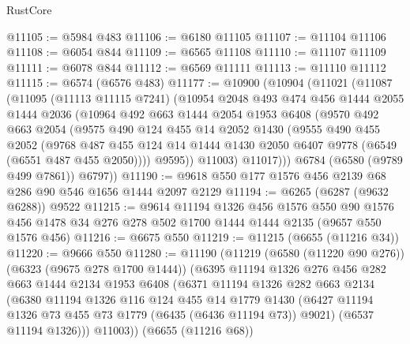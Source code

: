 \begin{lexlean}{RustCore}
\begin{coremodule}
@11105 := @5984 @483
@11106 := @6180 @11105
@11107 := @11104 @11106
@11108 := @6054 @844
@11109 := @6565 @11108
@11110 := @11107 @11109
@11111 := @6078 @844
@11112 := @6569 @11111
@11113 := @11110 @11112
@11115 := @6574 (@6576 @483)
@11177 := @10900
    (@10904
      (@11021
        (@11087
          (@11095
            (@11113 @11115 @7241)
            (@10954
              @2048
              @493
              @474
              @456
              @1444
              @2055
              @1444
              @2036
              (@10964
                @492
                @663
                @1444
                @2054
                @1953
                @6408
                (@9570
                  @492
                  @663
                  @2054
                  (@9575
                    @490
                    @124
                    @455
                    @14
                    @2052
                    @1430
                    (@9555
                      @490
                      @455
                      @2052
                      (@9768
                        @487
                        @455
                        @124
                        @14
                        @1444
                        @1430
                        @2050
                        @6407
                        @9778
                        (@6549 (@6551 @487 @455 @2050))))
                    @9595))
                @11003)
              @11017)))
        @6784
        (@6580 (@9789 @499 @7861))
        @6797))
@11190 := @9618 @550 @177 @1576 @456 @2139 @68 @286 @90 @546 @1656 @1444 @2097 @2129
@11194 := @6265 (@6287 (@9632 @6288)) @9522
@11215 := @9614
    @11194
    @1326
    @456
    @1576
    @550
    @90
    @1576
    @456
    @1478
    @34
    @276
    @278
    @502
    @1700
    @1444
    @1444
    @2135
    (@9657 @550 @1576 @456)
@11216 := @6675 @550
@11219 := @11215 (@6655 (@11216 @34))
@11220 := @9666 @550
@11280 := @11190
    (@11219
      (@6580 (@11220 @90 @276))
      (@6323 (@9675 @278 @1700 @1444))
      (@6395
        @11194
        @1326
        @276
        @456
        @282
        @663
        @1444
        @2134
        @1953
        @6408
        (@6371
          @11194
          @1326
          @282
          @663
          @2134
          (@6380
            @11194
            @1326
            @116
            @124
            @455
            @14
            @1779
            @1430
            (@6427 @11194 @1326 @73 @455 @73 @1779 (@6435 (@6436 @11194 @73)) @9021)
            (@6537 @11194 @1326)))
        @11003))
    (@6655 (@11216 @68))

\end{coremodule}
\end{lexlean}
